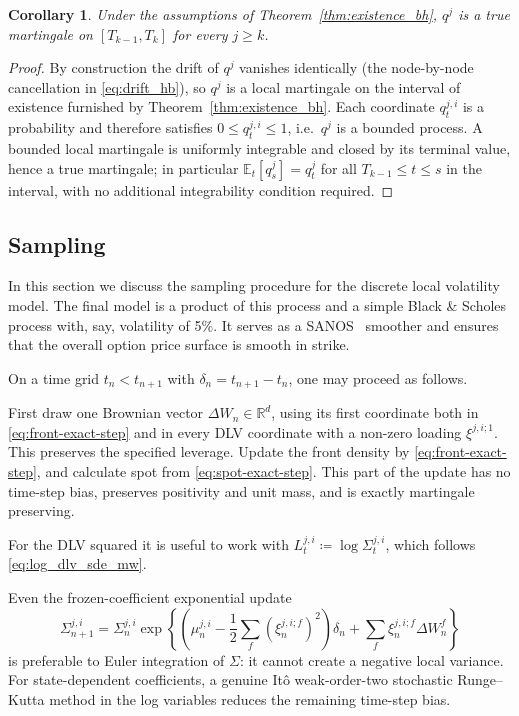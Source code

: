 \documentclass[11pt]{article}
\theoremstyle{plain}
\newtheorem{corollary}[theorem]{Corollary}
\theoremstyle{definition}
\theoremstyle{remark}
\begin{document}
\begin{corollary}
\label{cor:true_martingale_mw}
Under the assumptions of Theorem~\ref{thm:existence_bh}, $q^j$ is a true martingale on $[T_{k-1},T_k]$ for every $j\geq k$.
\end{corollary}
\begin{proof}
By construction the drift of $q^j$ vanishes identically (the node-by-node cancellation in \eqref{eq:drift_hb}), so $q^j$ is a local martingale on the interval of existence furnished by Theorem~\ref{thm:existence_bh}. Each coordinate $q_t^{j,i}$ is a probability and therefore satisfies $0\leq q_t^{j,i}\leq 1$, i.e.\ $q^j$ is a bounded process. A bounded local martingale is uniformly integrable and closed by its terminal value, hence a true martingale; in particular $\mathbb E_t[q_s^j]=q_t^j$ for all $T_{k-1}\leq t\leq s$ in the interval, with no additional integrability condition required.
\end{proof}

\subsection{Sampling}
\label{sec:sampling}

  In this section we discuss the sampling procedure for the discrete local volatility model. The final model is a product of this 
  process and a simple Black \& Scholes process with, say, volatility of 5\%. It serves as a SANOS~\cite{SANOS2026} smoother and ensures
  that the overall option price surface is smooth in strike.

   On a time grid
  $t_n<t_{n+1}$ with $\delta_n=t_{n+1}-t_n$, one may proceed as follows.

  First draw one Brownian vector $\Delta W_n\in\mathbb R^d$, using its first
  coordinate both in \eqref{eq:front-exact-step} and in every DLV coordinate
  with a non-zero loading $\xi^{j,i;1}$. This preserves the specified leverage.
  Update the front density by \eqref{eq:front-exact-step}, and calculate spot
  from \eqref{eq:spot-exact-step}. This part of the update has no time-step
  bias, preserves positivity and unit mass, and is exactly martingale
  preserving.

  For the DLV squared it is useful to work with
  $L_t^{j,i}\coloneqq\log\Sigma_t^{j,i}$, which follows \eqref{eq:log_dlv_sde_mw}. 

  Even the frozen-coefficient exponential update
  \begin{equation}
    \label{eq:dlv-log-euler}
    \Sigma_{n+1}^{j,i}
      =\Sigma_n^{j,i}\exp\!\left\{
        \left(\mu_n^{j,i}
          -\frac12\sum_f(\xi_n^{j,i;f})^2\right)\delta_n
        +\sum_f\xi_n^{j,i;f}\Delta W_n^f
      \right\}
  \end{equation}
  is preferable to Euler integration of $\Sigma$: it cannot create a negative
  local variance. For state-dependent coefficients, a genuine It\^o
  weak-order-two stochastic Runge--Kutta method in the log variables reduces
  the remaining time-step bias.
\end{document}
